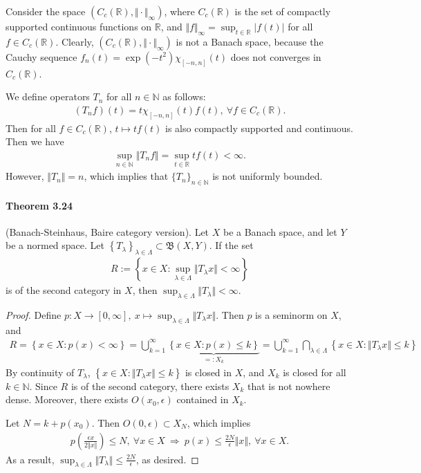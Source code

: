 \documentclass{article}
\begin{document}
Consider the space $(C_c(\mathbb{R}),\Vert\cdot\Vert_\infty)$, where $C_c(\mathbb{R})$ is the set of compactly supported continuous functions on $\mathbb{R}$, and $\Vert f\Vert_\infty=\sup_{t\in\mathbb{R}}\vert f(t)\vert$ for all $f\in C_c(\mathbb{R})$. Clearly, $(C_c(\mathbb{R}),\Vert\cdot\Vert_\infty)$ is not a Banach space, because the Cauchy sequence $f_n(t) = \exp(-t^2)\chi_{[-n,n]}(t)$ does not converges in $C_c(\mathbb{R})$.

We define operators $T_n$ for all $n\in\mathbb{N}$ as follows:
\begin{align*}
	(T_n f)(t) = t\chi_{[-n,n]}(t)f(t),\ \forall f\in C_c(\mathbb{R}).
\end{align*}
Then for all $f\in C_c(\mathbb{R})$, $t\mapsto tf(t)$ is also compactly supported and continuous. Then we have
\begin{align*}
	\sup_{n\in\mathbb{N}}\Vert T_n f\Vert = \sup_{t\in\mathbb{R}} tf(t) < \infty.
\end{align*}
However, $\Vert T_n\Vert = n$, which implies that $\{T_n\}_{n\in\mathbb{N}}$ is not uniformly bounded.

\paragraph{Theorem 3.24\label{thm:3.24}} (Banach-Steinhaus, Baire category version). Let $X$ be a Banach space, and let $Y$ be a normed space. Let $\left\{T_\lambda\right\}_{\lambda\in\Lambda}\subset\mathfrak{B}(X,Y)$. If the set 
\begin{align*}
	R:=\left\{x\in X:\sup_{\lambda\in\Lambda}\Vert T_\lambda x\Vert < \infty\right\}
\end{align*}
is of the second category in $X$, then $\sup_{\lambda\in\Lambda}\Vert T_\lambda\Vert < \infty$.
\begin{proof}
Define $p:X\to[0,\infty],\ x\mapsto\sup_{\lambda\in\Lambda}\Vert T_\lambda x\Vert$. Then $p$ is a seminorm on $X$, and
\begin{align*}
	R=\left\{x\in X:p(x)<\infty\right\} = \bigcup_{k=1}^\infty\underbrace{\left\{x\in X:p(x)\leq k\right\}}_{=:X_k} = \bigcup_{k=1}^\infty\bigcap_{\lambda\in\Lambda}\left\{x\in X:\Vert T_\lambda x\Vert\leq k\right\}
\end{align*}
By continuity of $T_\lambda$, $\left\{x\in X:\Vert T_\lambda x\Vert\leq k\right\}$ is closed in $X$, and $X_k$ is closed for all $k\in\mathbb{N}$. Since $R$ is of the second category, there exists $X_k$ that is not nowhere dense. Moreover, there exists $O(x_0,\epsilon)$ contained in $X_k$.

Let $N=k+p(x_0)$. Then $O(0,\epsilon)\subset X_N$, which implies
\begin{align*}
	p\left(\frac{\epsilon x}{2\Vert x\Vert}\right)\leq N,\ \forall x\in X\ \Rightarrow\ p\left(x\right)\leq \frac{2N}{\epsilon}\Vert x\Vert,\ \forall x\in X.
\end{align*}
As a result,  $\sup_{\lambda\in\Lambda}\Vert T_\lambda\Vert\leq\frac{2N}{\epsilon}$, as desired.
\end{proof}
\end{document}

